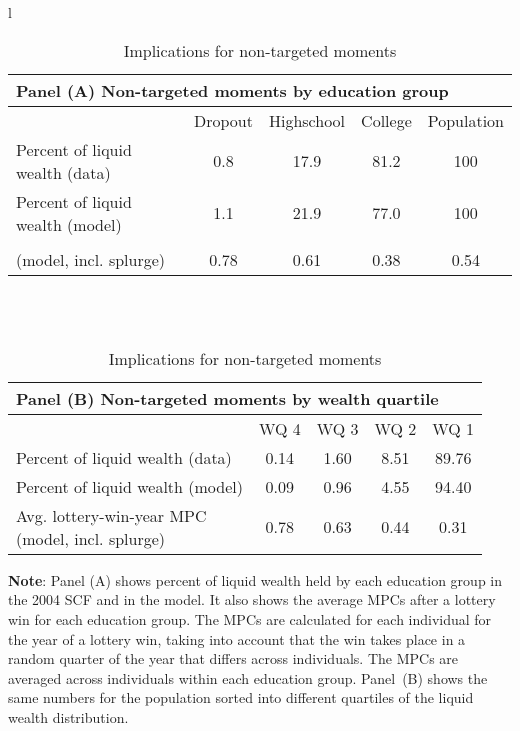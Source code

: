 \documentclass[\econtexRoot/HAFiscal]{subfiles}
\begin{document}
\begin{table}[th]
	\begin{center}
		\begin{tabular}{l}
			\begin{tabular}{lcccc}
				\multicolumn{5}{l}{Panel (A) Non-targeted moments by education group} \\ \midrule
				& Dropout & Highschool & College & Population \\ \midrule
				Percent of liquid wealth (data) & 0.8 & 17.9 & 81.2 & 100 \\
				Percent of liquid wealth (model) & 1.1 & 21.9 & 77.0 & 100 \\
				\makecell[l]{Avg. lottery-win-year MPC \\ (model, incl. splurge)} & 0.78 & 0.61 & 0.38 & 0.54
				\\ \bottomrule 
			\end{tabular} \\ \\ 
			
			\begin{tabular}{lcccc}
				\multicolumn{5}{l}{Panel (B) Non-targeted moments by wealth quartile} \\ \midrule
				 & WQ 4 & WQ 3 & WQ 2 & WQ 1 \\ \midrule
				Percent of liquid wealth (data) & 0.14 & 1.60 & 8.51 & 89.76 \\
				Percent of liquid wealth (model) & 0.09 & 0.96 & 4.55 & 94.40 \\
				\makecell[l]{Avg. lottery-win-year MPC \\ (model, incl. splurge)} & 0.78 & 0.63 & 0.44 & 0.31
				\\ \bottomrule 
			\end{tabular}
		\end{tabular}
		\caption{Implications for non-targeted moments}
		\notinsubfile{\label{tab:nonTargetedMoments}}
		\parbox{16cm}{\small \vspace{.15cm} \textbf{Note}: Panel (A) shows percent of liquid wealth held by each education group in the 2004 SCF and in the model. It also shows the average MPCs after a lottery win for each education group. The MPCs are calculated for each individual for the year of a lottery win, taking into account that the win takes place in a random quarter of the year that differs across individuals. The MPCs are averaged across individuals within each education group. Panel~(B) shows the same numbers for the population sorted into different quartiles of the liquid wealth distribution.\normalsize}
	\end{center}
\end{table}
\end{document}
